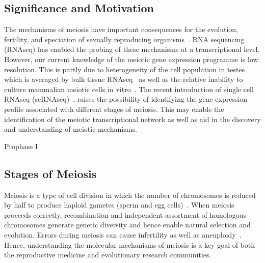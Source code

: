 \subsection{Significance and Motivation}
The mechanisms of meiosis have important consequences for the evolution, fertility, and speciation of sexually reproducing organisms~\cite{Davies2016Reengineering,Hassold2007Origin}. RNA sequencing (RNAseq) has enabled the probing of these mechanisms at a transcriptional level. However, our current knowledge of the meiotic gene expression programme is low resolution. This is partly due to heterogeneity of the cell population in testes which is averaged by bulk tissue RNAseq~\cite{YasuhiroFUJIWAR2014Differential} as well as the relative inability to culture mammalian meiotic cells in vitro~\cite{Zhou2016Complete}. The recent introduction of single cell RNAseq (scRNAseq)~\cite{Gawad2016Singlecell}, raises the possibility of identifying the gene expression profile associated with different stages of meiosis. This may enable the identification of the meiotic transcriptional network as well as aid in the discovery and understanding of meiotic mechanisms.


Prophase I

\subsection{Stages of Meiosis}
Meiosis is a type of cell division in which the number of chromosomes is reduced by half to produce haploid gametes (sperm and egg cells)~\cite{Ohkura2015Meiosis}. When meiosis proceeds correctly, recombination and independent assortment of homologous chromosomes generate genetic diversity and hence enable natural selection and evolution. Errors during meiosis can cause infertility as well as aneuploidy~\cite{Handel2010Genetics,Hassold2007Origin}. Hence, understanding the molecular mechanisms of meiosis is a key goal of both the reproductive medicine and evolutionary research communities.

